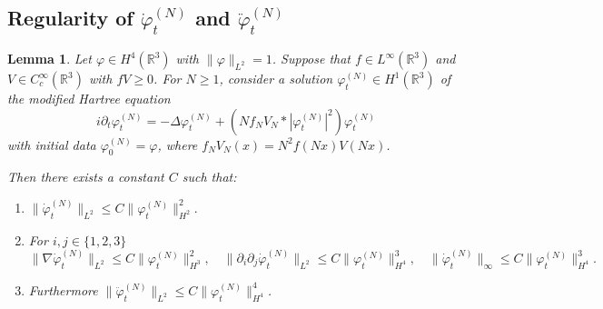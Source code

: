 \documentclass[11pt,a4paper,DIV11]{scrartcl}	%
\newtheorem{lem}[thm]{Lemma}
\newcommand{\R}{\mathds{R}}
\newcommand{\norm}[1]{\lVert#1\rVert}	%
\newcommand{\ph}{\varphi_t^{(N)}}	%
\newcommand{\phdot}{\dot{\varphi}_t^{(N)}}	%
\newcommand{\phddot}{\ddot{\varphi}_t^{(N)}}	%
\newcommand{\bd}{\begin{displaymath}}			%
\newcommand{\ed}{\end{displaymath}}
\begin{document}
\subsection{Regularity of $\phdot$ and $\phddot$}
\label{sec:phdotreg}
\label{ss:phdotreg}
\begin{lem} \label{lm:phdotregularity}
Let $\varphi \in H^4(\R^3)$ with $\| \varphi \|_{L^2} = 1$. Suppose that
  $f \in L^\infty(\R^3)$ and $V \in C_c^\infty(\R^3)$ with $fV \ge 0$. For $N \ge
  1$, consider a solution $\varphi_t^{(N)} \in H^1(\R^3)$ of the modified
  Hartree equation
  \[
    i \partial_t \varphi_t^{(N)} = - \Delta \varphi_t^{(N)} + (N f_N V_N *
    |\varphi_t^{(N)}|^2) \varphi_t^{(N)}
  \]
  with initial data $\varphi^{(N)}_0 = \varphi$, where $f_N V_N(x) = N^2
  f(Nx)V(Nx)$.

Then there exists a constant $C$ such that:
\begin{enumerate}
 \item $\norm{\phdot}_{L^2} \leq C \norm{\ph}_{H^2}^2.$ %
\item For $i, j \in \{1,2,3\}$
\bd
\norm{\nabla \phdot}_{L^2} \leq C \norm{\ph}_{H^3}^2, \quad
\norm{\partial_i \partial_j \phdot}_{L^2} \leq C \norm{\ph}_{H^4}^3, \quad \norm{\phdot}_\infty \leq C \norm{\ph}_{H^4}^3.
\ed
\item Furthermore $\norm{\phddot}_{L^2} \leq C \norm{\ph}_{H^4}^4$.
\end{enumerate}
\end{lem}
\end{document}
